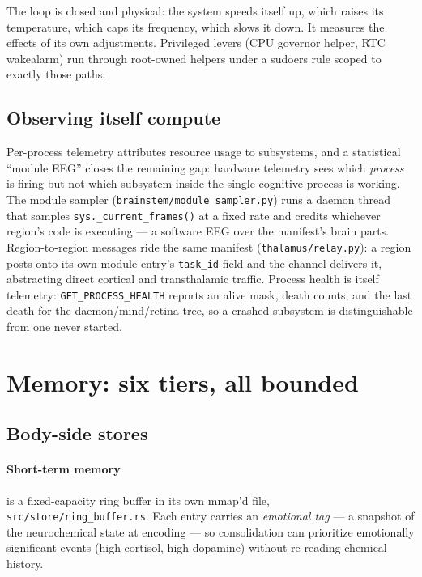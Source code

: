 \documentclass[11pt]{article}
\newcommand{\code}[1]{\texttt{\small #1}}
\begin{document}
The loop is closed and physical: the system speeds itself up, which
raises its temperature, which caps its frequency, which slows it down.
It measures the effects of its own adjustments. Privileged levers (CPU
governor helper, RTC wakealarm) run through root-owned helpers under a
sudoers rule scoped to exactly those paths.

\subsection{Observing itself compute}

Per-process telemetry attributes resource usage to subsystems, and a
statistical ``module EEG'' closes the remaining gap: hardware telemetry
sees which \emph{process} is firing but not which subsystem inside the
single cognitive process is working. The module sampler
(\code{brainstem/module\_sampler.py}) runs a daemon thread that samples
\code{sys.\_current\_frames()} at a fixed rate and credits whichever
region's code is executing --- a software EEG over the manifest's brain
parts. Region-to-region messages ride the same manifest
(\code{thalamus/relay.py}): a region posts onto its own module entry's
\code{task\_id} field and the channel delivers it, abstracting direct
cortical and transthalamic traffic. Process health is itself telemetry:
\code{GET\_PROCESS\_HEALTH} reports an alive mask, death counts, and
the last death for the daemon/mind/retina tree, so a crashed subsystem
is distinguishable from one never started.

\section{Memory: six tiers, all bounded}

\subsection{Body-side stores}

\paragraph{Short-term memory} is a fixed-capacity ring buffer in its
own mmap'd file, \code{src/store/ring\_buffer.rs}. Each entry carries
an \emph{emotional tag} --- a snapshot of the neurochemical state at
encoding --- so consolidation can prioritize emotionally significant
events (high cortisol, high dopamine) without re-reading chemical
history.
\end{document}

